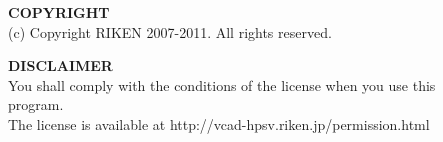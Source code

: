 \documentclass[a4paper,10pt,oneside,fleqn]{jsbook}
\newcounter{program}
\begin{document}
\vspace{15cm}

\begin{description}
\item[ ] \textbf{COPYRIGHT}\\
(c) Copyright RIKEN 2007-2011. All rights reserved.\\

\item[ ] \textbf{DISCLAIMER}\\
You shall comply with the conditions of the license when you use this program.\\
The license is available at http://vcad-hpsv.riken.jp/permission.html
\end{description}
%

\tableofcontents
%
%
\mainmatter


\end{document}
